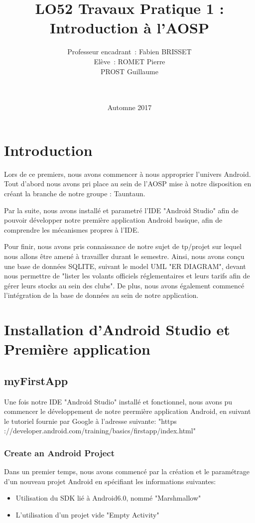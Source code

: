 \documentclass[french,a4paper,12pt]{report}
\title{LO52 Travaux Pratique 1 :\\ Introduction à l'AOSP}
\author{Professeur encadrant : Fabien BRISSET \\ Elève : ROMET Pierre
\\PROST Guillaume \\ \\ \\}
\date{Automne 2017}
\begin{document}
\maketitle
\tableofcontents

\chapter{Introduction}
Lors de ce premiers, nous avons commencer à nous approprier l'univers Android.
Tout d'abord nous avons pri place au sein de l'AOSP mise à notre disposition
en créant la branche de notre groupe : Tauntaun.

Par la suite, nous avons installé et parametré l'IDE "Android Studio" afin de
pouvoir développer notre première application Android basique, afin de
comprendre les mécanismes propres à l'IDE.

Pour finir, nous avons pris connaissance de notre sujet de tp/projet sur
lequel nous allons être amené à travailler durant le semestre.
Ainsi, nous avons conçu une base de données SQLITE, suivant le model UML
"ER DIAGRAM", devant nous permettre de "lister les volants officiels
réglementaires et leurs tarifs afin de gérer leurs stocks au sein des clubs".
De plus, nous avons également commencé l'intégration de la base de données au
sein de notre application.


\chapter{Installation d'Android Studio et Première application}
\section{myFirstApp}
Une fois notre IDE "Android Studio" installé et fonctionnel, nous avons pu
commencer le développement de notre prermière application Android, en suivant
le tutoriel fournie par Google à l'adresse suivante:
"https ://developer.android.com/training/basics/firstapp/index.html"
\subsection{Create an Android Project}
Dans un premier temps, nous avons commencé par la création et le paramétrage
d'un nouveau projet Android en spécifiant les informations suivantes:
\begin{itemize}
  \item Utilisation du SDK lié à Android6.0, nommé "Marshmallow"
  \item L'utilisation d'un projet vide "Empty Activity"
\end{itemize}
\end{document}
